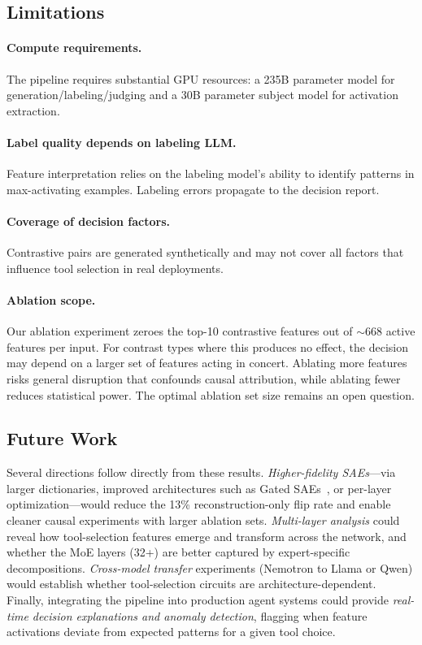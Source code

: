 \documentclass[runningheads]{llncs}
\begin{document}
\subsection{Limitations}

\paragraph{Compute requirements.} The pipeline requires substantial GPU resources: a 235B parameter model for generation/labeling/judging and a 30B parameter subject model for activation extraction.

\paragraph{Label quality depends on labeling LLM.} Feature interpretation relies on the labeling model's ability to identify patterns in max-activating examples. Labeling errors propagate to the decision report.

\paragraph{Coverage of decision factors.} Contrastive pairs are generated synthetically and may not cover all factors that influence tool selection in real deployments.

\paragraph{Ablation scope.} Our ablation experiment zeroes the top-10 contrastive features out of ${\sim}668$ active features per input. For contrast types where this produces no effect, the decision may depend on a larger set of features acting in concert. Ablating more features risks general disruption that confounds causal attribution, while ablating fewer reduces statistical power. The optimal ablation set size remains an open question.

\subsection{Future Work}

Several directions follow directly from these results. \emph{Higher-fidelity SAEs}---via larger dictionaries, improved architectures such as Gated SAEs~\cite{rajamanoharan2024improvingdictionarylearninggated}, or per-layer optimization---would reduce the 13\% reconstruction-only flip rate and enable cleaner causal experiments with larger ablation sets. \emph{Multi-layer analysis} could reveal how tool-selection features emerge and transform across the network, and whether the MoE layers (32+) are better captured by expert-specific decompositions. \emph{Cross-model transfer} experiments (Nemotron to Llama or Qwen) would establish whether tool-selection circuits are architecture-dependent. Finally, integrating the pipeline into production agent systems could provide \emph{real-time decision explanations and anomaly detection}, flagging when feature activations deviate from expected patterns for a given tool choice.
\end{document}
